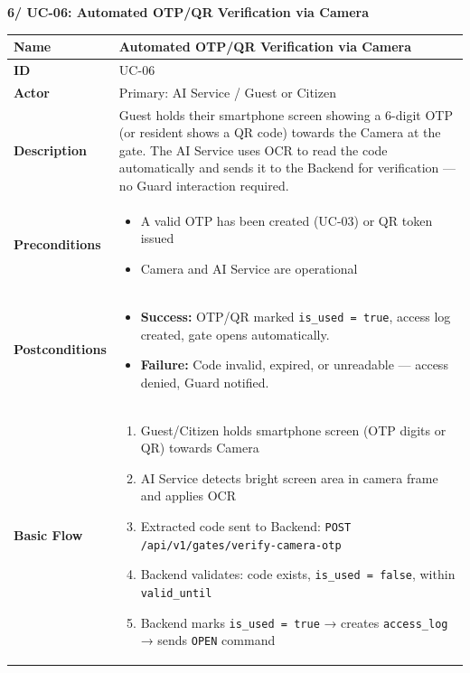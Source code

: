 \documentclass[a4paper]{article}
\newlength{\ucLeft}
\begin{document}
\newpage
\noindent \textbf{6/ UC-06: Automated OTP/QR Verification via Camera}
\setlength{\tabcolsep}{6pt}
\renewcommand{\arraystretch}{1.2}
\setlength{\ucLeft}{30mm}

\begin{longtable}{|>{\bfseries}p{\ucLeft}|
                p{\dimexpr\textwidth-\ucLeft-4\tabcolsep-3\arrayrulewidth\relax}|}
\hline
Name & Automated OTP/QR Verification via Camera \\ \hline
ID & UC-06 \\ \hline
Actor & Primary: AI Service / Guest or Citizen \\ \hline
Description & Guest holds their smartphone screen showing a 6-digit OTP (or resident shows a QR code) towards the Camera at the gate. The AI Service uses OCR to read the code automatically and sends it to the Backend for verification — no Guard interaction required.\\ \hline
Preconditions &
\begin{itemize}[leftmargin=*, nosep, topsep=0pt, partopsep=0pt, parsep=0pt]
    \item A valid OTP has been created (UC-03) or QR token issued
    \item Camera and AI Service are operational
\end{itemize}
\\ \hline
Postconditions &
\begin{itemize}[leftmargin=*, nosep, topsep=0pt, partopsep=0pt, parsep=0pt, after=\strut]
    \item \textbf{Success:} OTP/QR marked \texttt{is\_used = true}, access log created, gate opens automatically.
    \item \textbf{Failure:} Code invalid, expired, or unreadable — access denied, Guard notified.
\end{itemize}
\\ \hline
Basic Flow & 
\begin{enumerate}[leftmargin=*, nosep, topsep=0pt, partopsep=0pt, parsep=0pt]
    \item Guest/Citizen holds smartphone screen (OTP digits or QR) towards Camera
    \item AI Service detects bright screen area in camera frame and applies OCR
    \item Extracted code sent to Backend: \texttt{POST /api/v1/gates/verify-camera-otp}
    \item Backend validates: code exists, \texttt{is\_used = false}, within \texttt{valid\_until}
    \item Backend marks \texttt{is\_used = true} → creates \texttt{access\_log} → sends \texttt{OPEN} command

\end{enumerate}
\end{longtable}
\end{document}
